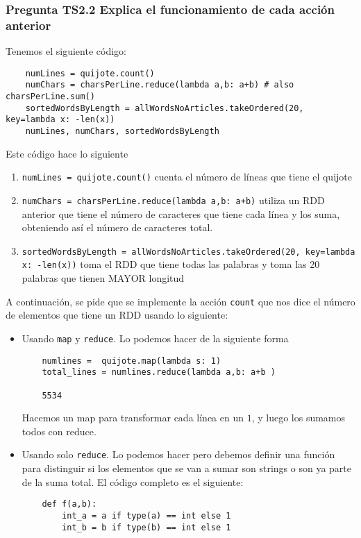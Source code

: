 \documentclass[11pt]{article}
\def\inline{\lstinline[basicstyle=\ttfamily,keywordstyle={}]}
\begin{document}
{{\subsubsection{ Pregunta TS2.2 Explica el funcionamiento de cada acción anterior }

Tenemos el siguiente código:
\begin{verbatim}
    numLines = quijote.count()
    numChars = charsPerLine.reduce(lambda a,b: a+b) # also charsPerLine.sum()
    sortedWordsByLength = allWordsNoArticles.takeOrdered(20, key=lambda x: -len(x))
    numLines, numChars, sortedWordsByLength
\end{verbatim}

Este código hace lo siguiente
\begin{enumerate}
\item \inline{numLines = quijote.count()} cuenta el número de líneas que tiene el quijote
\item \inline{numChars = charsPerLine.reduce(lambda a,b: a+b)} utiliza un RDD anterior que tiene el número de caracteres que tiene cada línea y los suma, obteniendo así el número de caracteres total.
\item \inline{sortedWordsByLength = allWordsNoArticles.takeOrdered(20, key=lambda x: -len(x))} toma el RDD que tiene todas las palabras y toma las 20 palabras que tienen MAYOR longitud
\end{enumerate}

A continuación, se pide que se implemente la acción \inline{count} que nos dice el número de elementos que tiene un RDD usando lo siguiente:
\begin{itemize}
    \item Usando \inline{map} y \inline{reduce}. Lo podemos hacer de la siguiente forma
    \begin{verbatim}
    numlines =  quijote.map(lambda s: 1)
    total_lines = numlines.reduce(lambda a,b: a+b )

    5534
    \end{verbatim}

    Hacemos un map para transformar cada línea en un $1$, y luego los sumamos todos con reduce.

    \item Usando solo \inline{reduce}. Lo podemos hacer pero debemos definir una función para distinguir si los elementos que se van a sumar son strings o son ya parte de la suma total. El código completo es el siguiente:
    \begin{verbatim}
    def f(a,b):
        int_a = a if type(a) == int else 1
        int_b = b if type(b) == int else 1
      

\end{verbatim}
\end{itemize}}}
\end{document}
